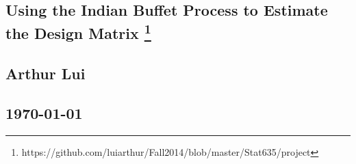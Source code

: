 \documentclass{article}
\begin{document}
\begin{center}
  \section*{\textbf{Using the Indian Buffet Process to Estimate the Design Matrix}
    \footnote{https://github.com/luiarthur/Fall2014/blob/master/Stat635/project}
  }
  \subsection*{\textbf{Arthur Lui}}
  \subsection*{\noindent\today}
\end{center}
\end{document}

